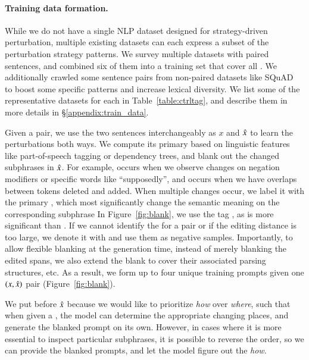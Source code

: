 \paragraph{Training data formation.}
While we do not have a single NLP dataset designed for strategy-driven perturbation, multiple existing datasets can each express a subset of the perturbation strategy patterns.
We survey multiple datasets with paired sentences, and combined six of them into a training set that cover all \tagstrs.
We additionally crawled some sentence pairs from non-paired datasets like SQuAD~\cite{rajpurkar-etal-2016-squad} to boost some specific patterns and increase lexical diversity. 
We list some of the representative datasets for each \tagstr in Table~\ref{table:ctrltag}, and describe them in more details in \S\ref{appendix:train_data}.

Given a pair, we use the two sentences interchangeably as $x$ and $\hat{x}$ to learn the perturbations both ways.
We compute its primary \tagstr based on linguistic features like part-of-speech tagging or dependency trees, and blank out the changed subphrases in $\hat{x}$.
For example,  occurs when we observe changes on negation modifiers or specific words like ``supposedly'', and  occurs when we have overlaps between tokens deleted and added.
When multiple changes occur, we label it with the primary \tagstr, which most significantly change the semantic meaning on the corresponding subphrase 
In Figure~\ref{fig:blank}, we use the tag , as  is more significant than .
If we cannot identify the \tagstr for a pair or if the editing distance is too large, we denote it with \ctrltag{[global]} and use them as negative samples.
Importantly, to allow flexible blanking at the generation time, instead of merely blanking the edited spans, we also extend the blank to cover their associated parsing structures, etc.
As a result, we form up to four unique training prompts given one $(x, \hat{x})$ pair (Figure~\ref{fig:blank}).


We put \tagstrs before $\hat{x}$ because we would like to prioritize \emph{how} over \emph{where}, such that when given a \tagstr, the model can determine the appropriate changing places, and generate the blanked prompt on its own. 
However, in cases where it is more essential to inspect particular subphrases, it is possible to reverse the order, so we can provide the blanked prompts, and let the model figure out the \emph{how}.

